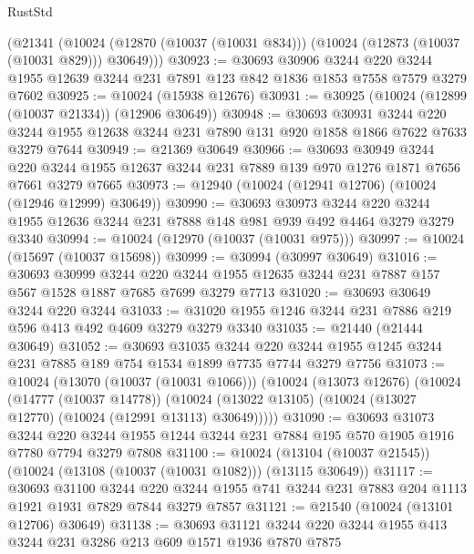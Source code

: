 \begin{lexlean}{RustStd}
\begin{coremodule}
{\begin{coremodule}
{{{{{{{{{{{{{{{{{{{{{{{{{{    (@21341
      (@10024 (@12870 (@10037 (@10031 @834))) (@10024 (@12873 (@10037 (@10031 @829))) @30649)))
@30923 := @30693
    @30906
    @3244
    @220
    @3244
    @1955
    @12639
    @3244
    @231
    @7891
    @123
    @842
    @1836
    @1853
    @7558
    @7579
    @3279
    @7602
@30925 := @10024 (@15938 @12676)
@30931 := @30925 (@10024 (@12899 (@10037 @21334)) (@12906 @30649))
@30948 := @30693
    @30931
    @3244
    @220
    @3244
    @1955
    @12638
    @3244
    @231
    @7890
    @131
    @920
    @1858
    @1866
    @7622
    @7633
    @3279
    @7644
@30949 := @21369 @30649
@30966 := @30693
    @30949
    @3244
    @220
    @3244
    @1955
    @12637
    @3244
    @231
    @7889
    @139
    @970
    @1276
    @1871
    @7656
    @7661
    @3279
    @7665
@30973 := @12940 (@10024 (@12941 @12706) (@10024 (@12946 @12999) @30649))
@30990 := @30693
    @30973
    @3244
    @220
    @3244
    @1955
    @12636
    @3244
    @231
    @7888
    @148
    @981
    @939
    @492
    @4464
    @3279
    @3279
    @3340
@30994 := @10024 (@12970 (@10037 (@10031 @975)))
@30997 := @10024 (@15697 (@10037 @15698))
@30999 := @30994 (@30997 @30649)
@31016 := @30693
    @30999
    @3244
    @220
    @3244
    @1955
    @12635
    @3244
    @231
    @7887
    @157
    @567
    @1528
    @1887
    @7685
    @7699
    @3279
    @7713
@31020 := @30693 @30649 @3244 @220 @3244
@31033 := @31020 @1955 @1246 @3244 @231 @7886 @219 @596 @413 @492 @4609 @3279 @3279 @3340
@31035 := @21440 (@21444 @30649)
@31052 := @30693
    @31035
    @3244
    @220
    @3244
    @1955
    @1245
    @3244
    @231
    @7885
    @189
    @754
    @1534
    @1899
    @7735
    @7744
    @3279
    @7756
@31073 := @10024
    (@13070 (@10037 (@10031 @1066)))
    (@10024
      (@13073 @12676)
      (@10024
        (@14777 (@10037 @14778))
        (@10024 (@13022 @13105) (@10024 (@13027 @12770) (@10024 (@12991 @13113) @30649)))))
@31090 := @30693
    @31073
    @3244
    @220
    @3244
    @1955
    @1244
    @3244
    @231
    @7884
    @195
    @570
    @1905
    @1916
    @7780
    @7794
    @3279
    @7808
@31100 := @10024 (@13104 (@10037 @21545)) (@10024 (@13108 (@10037 (@10031 @1082))) (@13115 @30649))
@31117 := @30693
    @31100
    @3244
    @220
    @3244
    @1955
    @741
    @3244
    @231
    @7883
    @204
    @1113
    @1921
    @1931
    @7829
    @7844
    @3279
    @7857
@31121 := @21540 (@10024 (@13101 @12706) @30649)
@31138 := @30693
    @31121
    @3244
    @220
    @3244
    @1955
    @413
    @3244
    @231
    @3286
    @213
    @609
    @1571
    @1936
    @7870
    @7875
}}}}}}}}}}}}}}}}}}}}}}}}}}
\end{coremodule}}
\end{coremodule}
\end{lexlean}
